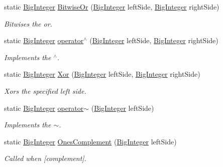 \begin{DoxyCompactItemize}
static \hyperlink{class_scott_garland_1_1_big_integer}{Big\+Integer} \hyperlink{class_scott_garland_1_1_big_integer_a6ef707f9d6bdf4add7be91ab89a7ac05}{Bitwise\+Or} (\hyperlink{class_scott_garland_1_1_big_integer}{Big\+Integer} left\+Side, \hyperlink{class_scott_garland_1_1_big_integer}{Big\+Integer} right\+Side)
\begin{DoxyCompactList}\small\item\em Bitwises the or. \end{DoxyCompactList}\item 
static \hyperlink{class_scott_garland_1_1_big_integer}{Big\+Integer} \hyperlink{class_scott_garland_1_1_big_integer_a68e9425800f6323298410d15c5d7ba83}{operator$^\wedge$} (\hyperlink{class_scott_garland_1_1_big_integer}{Big\+Integer} left\+Side, \hyperlink{class_scott_garland_1_1_big_integer}{Big\+Integer} right\+Side)
\begin{DoxyCompactList}\small\item\em Implements the $^\wedge$. \end{DoxyCompactList}\item 
static \hyperlink{class_scott_garland_1_1_big_integer}{Big\+Integer} \hyperlink{class_scott_garland_1_1_big_integer_a161209fa83f1b81fac13a0256b07c80e}{Xor} (\hyperlink{class_scott_garland_1_1_big_integer}{Big\+Integer} left\+Side, \hyperlink{class_scott_garland_1_1_big_integer}{Big\+Integer} right\+Side)
\begin{DoxyCompactList}\small\item\em Xors the specified left side. \end{DoxyCompactList}\item 
static \hyperlink{class_scott_garland_1_1_big_integer}{Big\+Integer} \hyperlink{class_scott_garland_1_1_big_integer_a1028f3352a4a6558c1cd8f9048068337}{operator$\sim$} (\hyperlink{class_scott_garland_1_1_big_integer}{Big\+Integer} left\+Side)
\begin{DoxyCompactList}\small\item\em Implements the $\sim$. \end{DoxyCompactList}\item 
static \hyperlink{class_scott_garland_1_1_big_integer}{Big\+Integer} \hyperlink{class_scott_garland_1_1_big_integer_ac47135fd6f248d218993915446bf5eb5}{Ones\+Complement} (\hyperlink{class_scott_garland_1_1_big_integer}{Big\+Integer} left\+Side)
\begin{DoxyCompactList}\small\item\em Called when \mbox{[}complement\mbox{]}. \end{DoxyCompactList}\item 

\end{DoxyCompactItemize}
